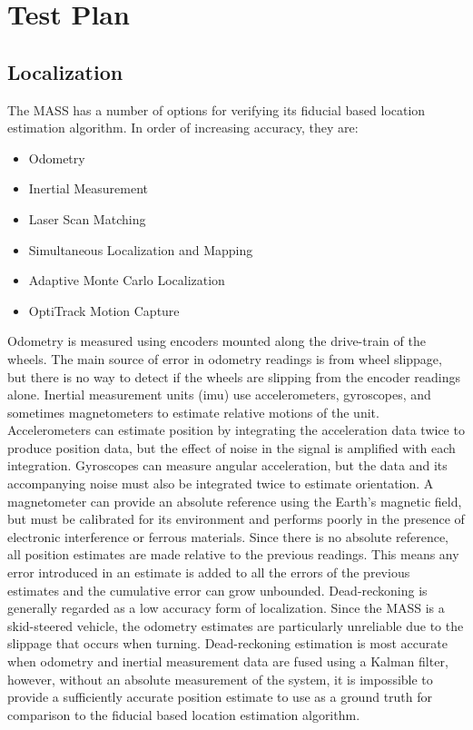 \section{Test Plan}
\label{sec:scenario}
\subsection{Localization}
\label{see:loctestscenario}
The MASS has a number of options for verifying its fiducial based location estimation algorithm. In order of increasing accuracy, they are:
\begin{itemize}
    \item Odometry
    \item Inertial Measurement
    \item Laser Scan Matching
    \item Simultaneous Localization and Mapping
    \item Adaptive Monte Carlo Localization
    \item OptiTrack Motion Capture
\end{itemize}

Odometry is measured using encoders mounted along the drive-train of the wheels. The main source of error in odometry readings is from wheel slippage, but there is no way to detect if the wheels are slipping from the encoder readings alone. Inertial measurement units (\acrshort{imu}) use accelerometers, gyroscopes, and sometimes magnetometers to estimate relative motions of the unit. Accelerometers can estimate position by integrating the acceleration data twice to produce position data, but the effect of noise in the signal is amplified with each integration. Gyroscopes can measure angular acceleration, but the data and its accompanying noise must also be integrated twice to estimate orientation. A magnetometer can provide an absolute reference using the Earth's magnetic field, but must be calibrated for its environment and performs poorly in the presence of electronic interference or ferrous materials. Since there is no absolute reference, all position estimates are made relative to the previous readings. This means any error introduced in an estimate is added to all the errors of the previous estimates and the cumulative error can grow unbounded. Dead-reckoning is generally regarded as a low accuracy form of localization. Since the MASS is a skid-steered vehicle, the odometry estimates are particularly unreliable due to the slippage that occurs when turning. Dead-reckoning estimation is most accurate when odometry and inertial measurement data are fused using a Kalman filter, however, without an absolute measurement of the system, it is impossible to provide a sufficiently accurate position estimate to use as a ground truth for comparison to the fiducial based location estimation algorithm.\\

